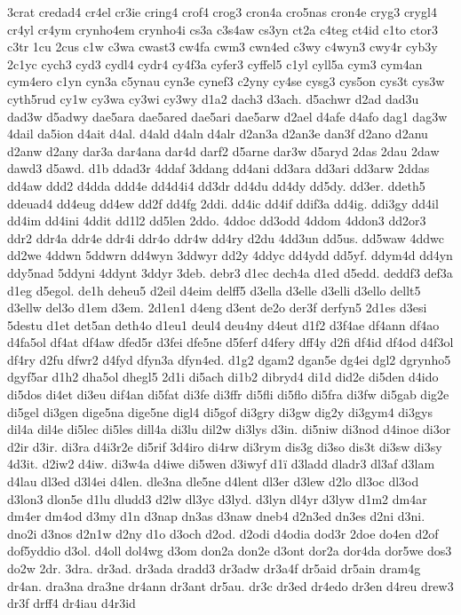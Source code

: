 {3crat
credad4
cr4el
cr3ie
cring4
crof4
crog3
cron4a
cro5nas
cron4e
cryg3
crygl4
cr4yl
cr4ym
crynho4em
crynho4i
cs3a
c3s4aw
cs3yn
ct2a
c4teg
ct4id
c1to
ctor3
c3tr
1cu
2cus
c1w
c3wa
cwast3
cw4fa
cwm3
cwn4ed
c3wy
c4wyn3
cwy4r
cyb3y
2c1yc
cych3
cyd3
cydl4
cydr4
cy4f3a
cyfer3
cyffel5
c1yl
cyll5a
cym3
cym4an
cym4ero
c1yn
cyn3a
c5ynau
cyn3e
cynef3
c2yny
cy4se
cysg3
cys5on
cys3t
cys3w
cyth5rud
cy1w
cy3wa
cy3wi
cy3wy
d1a2
dach3
d3ach.
d5achwr
d2ad
dad3u
dad3w
d5adwy
dae5ara
dae5ared
dae5ari
dae5arw
d2ael
d4afe
d4afo
dag1
dag3w
4dail
da5ion
d4ait
d4al.
d4ald
d4aln
d4alr
d2an3a
d2an3e
dan3f
d2ano
d2anu
d2anw
d2any
dar3a
dar4ana
dar4d
darf2
d5arne
dar3w
d5aryd
2das
2dau
2daw
dawd3
d5awd.
d1b
ddad3r
4ddaf
3ddang
dd4ani
dd3ara
dd3ari
dd3arw
2ddas
dd4aw
ddd2
d4dda
ddd4e
dd4d4i4
dd3dr
dd4du
dd4dy
dd5dy.
dd3er.
ddeth5
ddeuad4
dd4eug
dd4ew
dd2f
dd4fg
2ddi.
dd4ic
dd4if
ddif3a
dd4ig.
ddi3gy
dd4il
dd4im
dd4ini
4ddit
dd1l2
dd5len
2ddo.
4ddoc
dd3odd
4ddom
4ddon3
dd2or3
ddr2
ddr4a
ddr4e
ddr4i
ddr4o
ddr4w
dd4ry
d2du
4dd3un
dd5us.
dd5waw
4ddwc
dd2we
4ddwn
5ddwrn
dd4wyn
3ddwyr
dd2y
4ddyc
dd4ydd
dd5yf.
ddym4d
dd4yn
ddy5nad
5ddyni
4ddynt
3ddyr
3deb.
debr3
d1ec
dech4a
d1ed
d5edd.
deddf3
def3a
d1eg
d5egol.
de1h
deheu5
d2eil
d4eim
delff5
d3ella
d3elle
d3elli
d3ello
dellt5
d3ellw
del3o
d1em
d3em.
2d1en1
d4eng
d3ent
de2o
der3f
derfyn5
2d1es
d3esi
5destu
d1et
det5an
deth4o
d1eu1
deul4
deu4ny
d4eut
d1f2
d3f4ae
df4ann
df4ao
d4fa5ol
df4at
df4aw
dfed5r
d3fei
dfe5ne
d5ferf
d4fery
dff4y
d2fi
df4id
df4od
d4f3ol
df4ry
d2fu
dfwr2
d4fyd
dfyn3a
dfyn4ed.
d1g2
dgam2
dgan5e
dg4ei
dgl2
dgrynho5
dgyf5ar
d1h2
dha5ol
dhegl5
2d1i
di5ach
di1b2
dibryd4
di1d
did2e
di5den
d4ido
di5dos
di4et
di3eu
dif4an
di5fat
di3fe
di3ffr
di5fli
di5flo
di5fra
di3fw
di5gab
dig2e
di5gel
di3gen
dige5na
dige5ne
digl4
di5gof
di3gry
di3gw
dig2y
di3gym4
di3gys
dil4a
dil4e
di5lec
di5les
dill4a
di3lu
dil2w
di3lys
d3in.
di5niw
di3nod
d4inoe
di3or
d2ir
d3ir.
di3ra
d4i3r2e
di5rif
3d4iro
di4rw
di3rym
dis3g
di3so
dis3t
di3sw
di3sy
4d3it.
d2iw2
d4iw.
di3w4a
d4iwe
di5wen
d3iwyf
d1^^ef
d3ladd
dladr3
dl3af
d3lam
d4lau
dl3ed
d3l4ei
d4len.
dle3na
dle5ne
d4lent
dl3er
d3lew
d2lo
dl3oc
dl3od
d3lon3
dlon5e
d1lu
dludd3
d2lw
dl3yc
d3lyd.
d3lyn
dl4yr
d3lyw
d1m2
dm4ar
dm4er
dm4od
d3my
d1n
d3nap
dn3as
d3naw
dneb4
d2n3ed
dn3es
d2ni
d3ni.
dno2i
d3nos
d2n1w
d2ny
d1o
d3och
d2od.
d2odi
d4odia
dod3r
2doe
do4en
d2of
dof5yddio
d3ol.
d4oll
dol4wg
d3om
don2a
don2e
d3ont
dor2a
dor4da
dor5we
dos3
do2w
2dr.
3dra.
dr3ad.
dr3ada
dradd3
dr3adw
dr3a4f
dr5aid
dr5ain
dram4g
dr4an.
dra3na
dra3ne
dr4ann
dr3ant
dr5au.
dr3c
dr3ed
dr4edo
dr3en
d4reu
drew3
dr3f
drff4
dr4iau
d4r3id
}
